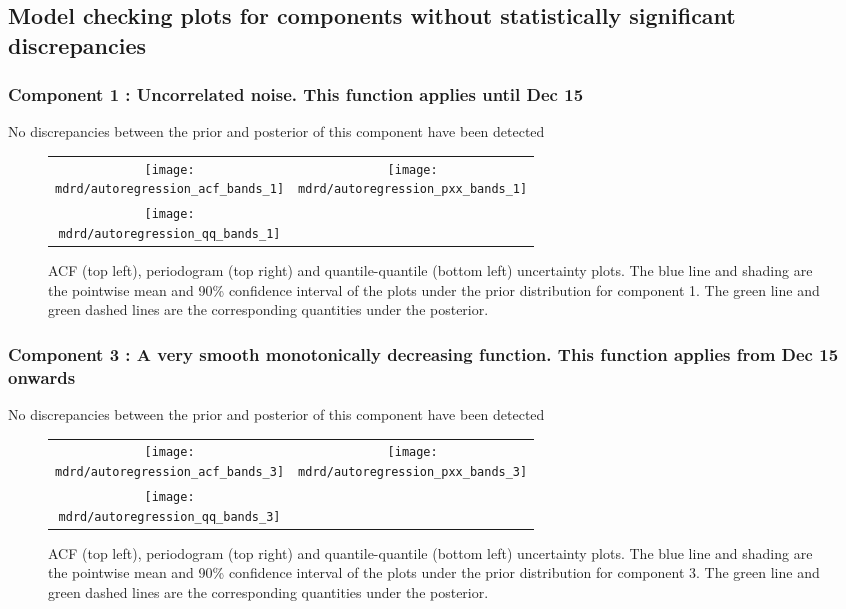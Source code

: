 \documentclass{article} %
\begin{document}
\subsection{Model checking plots for components without statistically significant discrepancies}

\subsubsection{Component 1 : Uncorrelated noise. This function applies until Dec   15}

No discrepancies between the prior and posterior of this component have been detected

\begin{figure}[H]
\newcommand{\wmgd}{0.5\columnwidth}
\newcommand{\hmgd}{3.0cm}
\newcommand{\mdrd}{autoregression}
\newcommand{\mbm}{\hspace{-0.3cm}}
\begin{tabular}{cc}
\mbm \texttt{[image: \\mdrd/autoregression\_acf\_bands\_1]} & \texttt{[image: \\mdrd/autoregression\_pxx\_bands\_1]} \\
\mbm \texttt{[image: \\mdrd/autoregression\_qq\_bands\_1]}
\end{tabular}
\caption{
ACF (top left), periodogram (top right) and quantile-quantile (bottom left) uncertainty plots.
The blue line and shading are the pointwise mean and 90\% confidence interval of the plots under the prior distribution for component 1.
The green line and green dashed lines are the corresponding quantities under the posterior.}
\label{fig:check1}
\end{figure}

\subsubsection{Component 3 : A very smooth monotonically decreasing function. This function applies from Dec   15 onwards}

No discrepancies between the prior and posterior of this component have been detected

\begin{figure}[H]
\newcommand{\wmgd}{0.5\columnwidth}
\newcommand{\hmgd}{3.0cm}
\newcommand{\mdrd}{autoregression}
\newcommand{\mbm}{\hspace{-0.3cm}}
\begin{tabular}{cc}
\mbm \texttt{[image: \\mdrd/autoregression\_acf\_bands\_3]} & \texttt{[image: \\mdrd/autoregression\_pxx\_bands\_3]} \\
\mbm \texttt{[image: \\mdrd/autoregression\_qq\_bands\_3]}
\end{tabular}
\caption{
ACF (top left), periodogram (top right) and quantile-quantile (bottom left) uncertainty plots.
The blue line and shading are the pointwise mean and 90\% confidence interval of the plots under the prior distribution for component 3.
The green line and green dashed lines are the corresponding quantities under the posterior.}
\label{fig:check3}
\end{figure}
\end{document}
